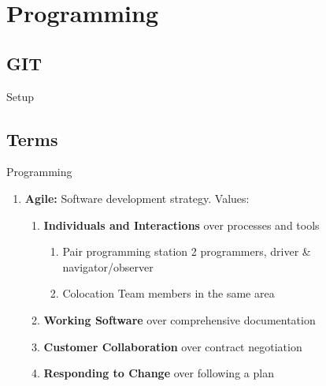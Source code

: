 \chapter{Programming}
\section{GIT}
	\begin{questions}{Setup}
		\begin{questionAnswer}
		\end{questionAnswer}
	\end{questions}

\section{Terms}
\begin{questions}{Programming}
	\begin{questionAnswer}
		\qItem{Agile}{See below \ref{sect:agile}}
	\end{questionAnswer}
	\begin{enumerate}
		\label{sect:agile}
		\item \textbf{Agile: } Software development strategy. Values:
			\begin{enumerate}
				\item \textbf{Individuals and Interactions} over processes and tools
					\begin{enumerate}
						\item Pair programming  station 2 programmers, driver \& navigator/observer
						\item Colocation \ra Team members in the same area
					\end{enumerate}
				\item \textbf{Working Software} over comprehensive documentation
				\item \textbf{Customer Collaboration} over contract negotiation
				\item \textbf{Responding to Change} over following a plan

			\end{enumerate}
	\end{enumerate}
\end{questions}

